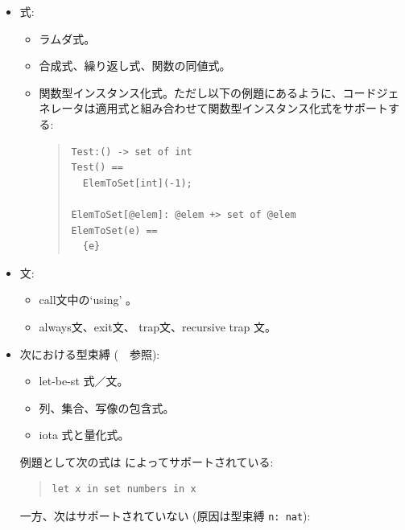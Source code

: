 \documentclass[\pformat,12pt]{jarticle}
\begin{document}
\begin{itemize}

\item 式:

  \begin{itemize}
  \item ラムダ式。
  \item 合成式、繰り返し式、関数の同値式。
  \item 関数型インスタンス化式。ただし以下の例題にあるように、コードジェネレータは適用式と組み合わせて関数型インスタンス化式をサポートする:

\begin{quote}
\begin{verbatim}
Test:() -> set of int
Test() ==
  ElemToSet[int](-1);

ElemToSet[@elem]: @elem +> set of @elem
ElemToSet(e) ==
  {e}
\end{verbatim}
\end{quote}

  \end{itemize}

\item 文: 

  \begin{itemize}
  \item call文中の`{\sf using}' 。
  \item always文、exit文、 trap文、recursive trap 文。
  \end{itemize}

\item 次における型束縛 (\langmancite　参照):

  \begin{itemize}
  \item let-be-st 式／文。
  \item 列、集合、写像の包含式。
  \item iota 式と量化式。
  \end{itemize}

例題として次の式は \tcg によってサポートされている:


\begin{quote}
\begin{verbatim}
let x in set numbers in x
\end{verbatim}
\end{quote}

一方、次はサポートされていない (原因は型束縛 \verb+n: nat+):


\end{itemize}
\end{document}
